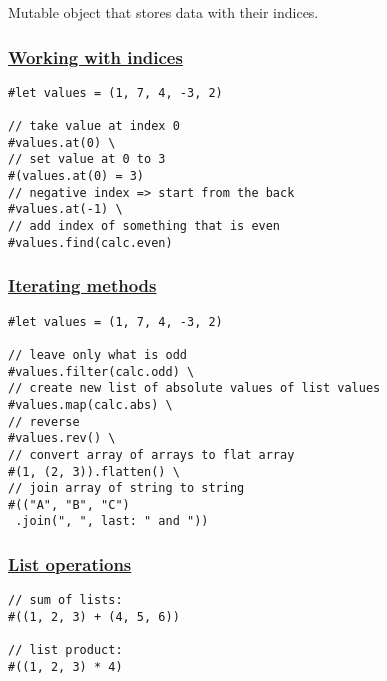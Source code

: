 Mutable object that stores data with their indices.

\subsubsection{\texorpdfstring{\hyperref[working-with-indices]{Working
with indices}}{Working with indices}}\label{working-with-indices}

\begin{verbatim}
#let values = (1, 7, 4, -3, 2)

// take value at index 0
#values.at(0) \
// set value at 0 to 3
#(values.at(0) = 3)
// negative index => start from the back
#values.at(-1) \
// add index of something that is even
#values.find(calc.even)
\end{verbatim}

\pandocbounded{}

\subsubsection{\texorpdfstring{\hyperref[iterating-methods]{Iterating
methods}}{Iterating methods}}\label{iterating-methods}

\begin{verbatim}
#let values = (1, 7, 4, -3, 2)

// leave only what is odd
#values.filter(calc.odd) \
// create new list of absolute values of list values
#values.map(calc.abs) \
// reverse
#values.rev() \
// convert array of arrays to flat array
#(1, (2, 3)).flatten() \
// join array of string to string
#(("A", "B", "C")
 .join(", ", last: " and "))
\end{verbatim}

\pandocbounded{}

\subsubsection{\texorpdfstring{\hyperref[list-operations]{List
operations}}{List operations}}\label{list-operations}

\begin{verbatim}
// sum of lists:
#((1, 2, 3) + (4, 5, 6))

// list product:
#((1, 2, 3) * 4)
\end{verbatim}

